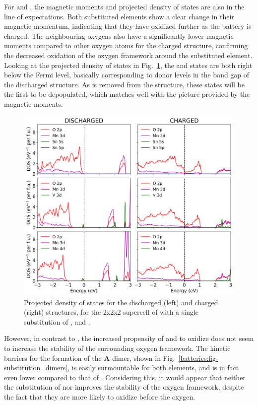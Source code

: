 \begin{refsection}
\pagebreak[5] For  and , the magnetic moments and projected density of states 
are also in the line of expectations. Both substituted elements show a clear 
change in their magnetic momentum, indicating that they have oxidized further 
as the battery is charged. The neighbouring oxygens  also have a 
significantly lower magnetic moments compared to other oxygen atoms  
for the charged structure, confirming the decreased oxidation of the oxygen 
framework around the substituted element. Looking at the projected density of 
states in Fig.~\ref{batteries:fig-substitution_pdos_pbeu}, the  and 
 states are both right below the Fermi level, basically corresponding 
to donor levels in the band gap of the discharged  structure. As 
 is removed from the structure, these states will be the first to be 
depopulated, which matches well with the picture provided by the magnetic 
moments. 
 
\begin{figure}[ht] 
\centering 
\captionsetup{width=0.9\linewidth}
\includegraphics[width=\textwidth]{figures/batteries/substitution_pdos_pbeu.png} 
\caption{Projected density of states for the discharged (left) and charged 
(right) structures, for the 2x2x2 supercell of  with a single 
substitution of ,  and .} 
\label{batteries:fig-substitution_pdos_pbeu} 
\end{figure} 

However, in contrast to , the increased propensity of  and 
 to oxidize does not seem to increase the stability of the surrounding 
oxygen framework. The kinetic barriers for the formation of the \textbf{A} 
dimer, shown in Fig.~\ref{batteries:fig-substitution_dimers}, is easily 
surmountable for both elements, and is in fact even lower compared to that of 
. Considering this, it would appear that neither the substitution 
of  nor  improves the stability of the oxygen framework, despite 
the fact that they are more likely to oxidize before the oxygen.  
 

\end{refsection}

